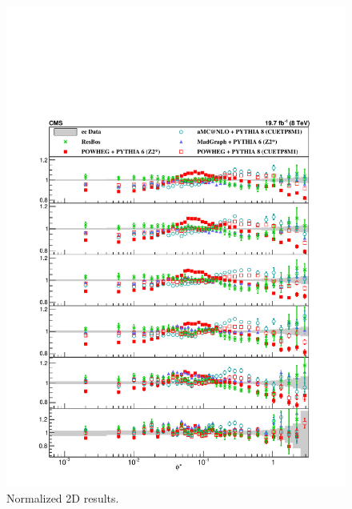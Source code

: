 \begin{figure}
    \centering
    \hspace*{-2cm}
    \includegraphics{figures/AppendexA/Ratio_ZShape_2D_ALLelec_PH_Norm_Born.pdf}
    \caption[ 2D results]{Normalized  2D results.}
    \label{fig:2DElectrons}
\end{figure}{}

